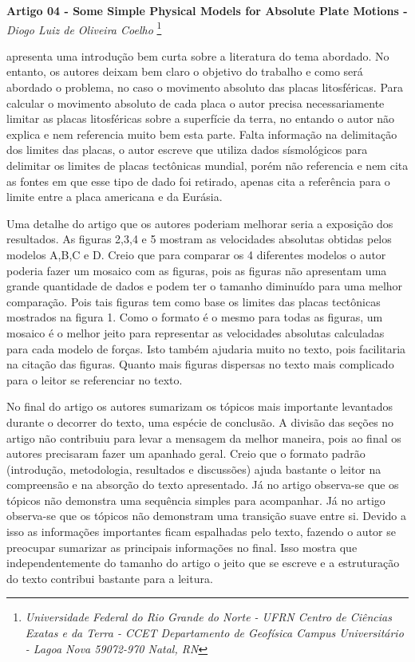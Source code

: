\documentclass[manuscript]{geophysics}
\begin{document}
\begin{center}
\textbf{\LARGE
 Artigo 04 - Some Simple Physical Models for Absolute Plate Motions - \cite{solomon_simple_1974}} \\
\textit{Diogo Luiz de Oliveira Coelho}
\footnote{\textit{Universidade Federal do Rio Grande do Norte - UFRN
Centro de Ciências Exatas e da Terra - CCET
Departamento de Geofísica
Campus Universitário - Lagoa Nova
59072-970 Natal, RN}}
\end{center} 

\cite{solomon_simple_1974} apresenta uma introdução bem curta sobre a literatura do tema abordado. No entanto, os autores deixam bem claro o objetivo do trabalho e como será abordado o problema, no caso o movimento absoluto das placas litosféricas. Para calcular o movimento absoluto de cada placa o autor precisa necessariamente limitar as placas litosféricas sobre a superfície da terra, no entando o autor não explica e nem referencia muito bem esta parte. Falta informação na delimitação dos limites das placas, o autor escreve que utiliza dados sísmológicos para delimitar os limites de placas tectônicas mundial, porém não referencia e nem cita as fontes em que esse tipo de dado foi retirado, apenas cita a referência para o limite entre a placa americana e da Eurásia.

Uma detalhe do artigo que os autores poderiam melhorar seria a exposição dos resultados. As figuras 2,3,4 e 5 mostram as velocidades absolutas obtidas pelos modelos A,B,C e D. Creio que para comparar os 4 diferentes modelos o autor poderia fazer um mosaico com as figuras, pois as figuras não apresentam uma grande quantidade de dados e podem ter o tamanho diminuído para uma melhor comparação. Pois tais figuras tem como base os limites das placas tectônicas mostrados na figura 1. Como o formato é o mesmo para todas as figuras, um mosaico é o melhor jeito para representar as velocidades absolutas calculadas para cada modelo de forças. Isto também ajudaria muito no texto, pois facilitaria na citação das figuras. Quanto mais figuras dispersas no texto mais complicado para o leitor se referenciar no texto.

No final do artigo os autores sumarizam os tópicos mais importante levantados durante o  decorrer do texto, uma espécie de conclusão. A divisão das seções no artigo não contribuiu para levar a mensagem da melhor maneira, pois ao final os autores precisaram fazer um apanhado geral. Creio que o formato padrão (introdução, metodologia, resultados e discussões) ajuda bastante o leitor na compreensão e na absorção do texto apresentado. Já no artigo observa-se que os tópicos não demonstra uma sequência simples para acompanhar. Já no artigo observa-se que os tópicos não demonstram uma transição suave entre si. Devido a isso as informações importantes ficam espalhadas pelo texto, fazendo o autor se preocupar sumarizar as principais informações no final. Isso mostra que independentemente do tamanho do artigo o jeito que se escreve e a estruturação do texto contribui bastante para a leitura. 



    
\end{document}
